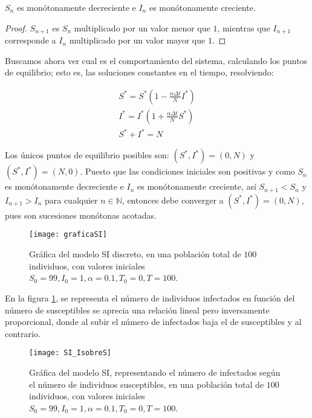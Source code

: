 \begin{lemma}
$S_n$ es monótonamente decreciente e $I_n$ es monótonamente creciente.
\end{lemma}

\begin{proof}
$S_{n+1}$ es $S_n$ multiplicado por un valor menor que $1$, mientras que $I_{n+1}$ corresponde a $I_n$ multiplicado por un valor mayor que $1$.
\end{proof}

Buscamos ahora ver cual es el comportamiento del sistema, calculando los puntos de equilibrio; esto es, las soluciones constantes en el tiempo, resolviendo:

$$
\begin{aligned}
S^*=S^*\left( 1-\frac{\alpha\Delta t}{N}I^*\right) \\
I^*=I^*\left( 1+\frac{\alpha\Delta t}{N}S^*\right) \\
S^*+I^*=N
\end{aligned}
$$

Los únicos puntos de equilibrio posibles son: $(S^*,I^*)=(0,N)$ y $(S^*,I^*)=(N,0)$. Puesto que las condiciones iniciales son positivas y como $S_n$ es monótonamente decreciente e $I_n$ es monótonamente creciente, así $S_{n+1}<S_n$ y $I_{n+1}>I_n$ para cualquier $n\in\mathbb{N}$, entonces debe converger a $(S^*,I^*)=(0,N)$, pues son sucesiones monótonas acotadas.



\begin{figure}
\begin{center}
\caption{Gráfica del modelo SI discreto, en una población total de $100$ individuos, con valores iniciales $S_0=99, I_0 = 1, \alpha = 0.1, T_0 = 0, T = 100$.}
\texttt{[image: graficaSI]}
\end{center}
\end{figure}

En la figura \ref{fig: SI_IsobreS}, se representa el número de individuos infectados en función del número de susceptibles se aprecia una relación lineal pero inversamente proporcional, donde al subir el número de infectados baja el de susceptibles y al contrario.

\begin{figure}
\begin{center}
\caption{Gráfica del modelo SI, representando el número de infectados según el número de individuos susceptibles, en una población total de $100$ individuos, con valores iniciales $S_0=99, I_0 = 1, \alpha = 0.1, T_0 = 0, T = 100$.}
\label{fig: SI_IsobreS}
\texttt{[image: SI\_IsobreS]}
\end{center}
\end{figure}

